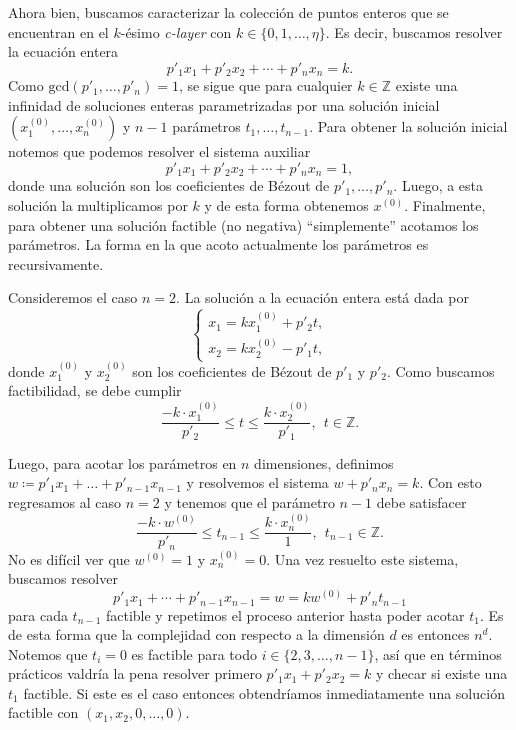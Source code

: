 \documentclass[11pt]{article}
\begin{document}
Ahora bien, buscamos caracterizar la colección de puntos enteros que se encuentran en el $k$-ésimo
\textit{c-layer} con $k \in \{0, 1, \ldots, \eta\}$. Es decir, buscamos resolver la ecuación entera
\begin{equation*}
	p'_1x_1 + p'_2x_2 + \cdots + p'_nx_n = k.
\end{equation*}
Como $\text{gcd}(p'_1, \ldots, p'_n) = 1$, se sigue que para cualquier $k \in \mathbb{Z}$ existe una
infinidad de soluciones enteras parametrizadas por una solución inicial $(x_1^{(0)}, \ldots,
x_n^{(0)})$ y $n - 1$ parámetros $t_1, \ldots, t_{n-1}$. Para obtener la solución inicial notemos
que podemos resolver el sistema auxiliar
\begin{equation*}
	p'_1x_1 + p'_2x_2 + \cdots + p'_nx_n = 1,
\end{equation*}
donde una solución son los coeficientes de Bézout de $p'_1, \ldots, p'_n$. Luego, a esta solución la
multiplicamos por $k$ y de esta forma obtenemos $x^{(0)}$. Finalmente, para obtener una solución
factible (no negativa) ``simplemente'' acotamos los parámetros. La forma en la que acoto actualmente
los parámetros es recursivamente.

Consideremos el caso $n = 2$. La solución a la ecuación entera está dada por
\begin{equation*}
	\begin{cases}
		x_1 = kx_1^{(0)} + p'_2t, \\
		x_2 = kx_2^{(0)} - p'_1t,
	\end{cases}
\end{equation*}
donde $x_1^{(0)}$ y $x_2^{(0)}$ son los coeficientes de Bézout de $p'_1$ y $p'_2$. Como buscamos
factibilidad, se debe cumplir 
\begin{equation*}
	\frac{-k\cdot x_1^{(0)}}{p'_2} \leq t \leq \frac{k \cdot x_2^{(0)}}{p'_1}, ~~ t \in \mathbb{Z}.
\end{equation*}

Luego, para acotar los parámetros en $n$ dimensiones, definimos $w \coloneq p'_1x_1 + \ldots +
p'_{n-1}x_{n-1}$ y resolvemos el sistema $w + p'_nx_n = k$. Con esto regresamos al caso $n = 2$ y
tenemos que el parámetro $n - 1$ debe satisfacer
\begin{equation*}
	\frac{-k\cdot w^{(0)}}{p'_n} \leq t_{n-1} \leq \frac{k \cdot x_n^{(0)}}{1}, ~~ t_{n-1} \in \mathbb{Z}.
\end{equation*}
No es difícil ver que $w^{(0)} = 1$ y $x_n^{(0)} = 0$. Una vez resuelto este sistema, buscamos
resolver
\begin{equation*}
	p'_1 x_1 + \cdots + p'_{n-1}x_{n-1} = w = kw^{(0)} + p'_nt_{n-1}
\end{equation*}
para cada $t_{n-1}$ factible y repetimos el proceso anterior hasta poder acotar $t_1$.
Es de esta forma que la complejidad con respecto a la dimensión $d$ es entonces $n^d$. Notemos que
$t_i = 0$ es factible para todo $i \in \{2, 3, \ldots, n - 1\}$, así que en términos prácticos
valdría la pena resolver primero $p'_1x_1 + p'_2x_2 = k$ y checar si existe una $t_1$ factible. Si
este es el caso entonces obtendríamos inmediatamente una solución factible con $(x_1, x_2, 0,
\ldots, 0)$.
\end{document}
